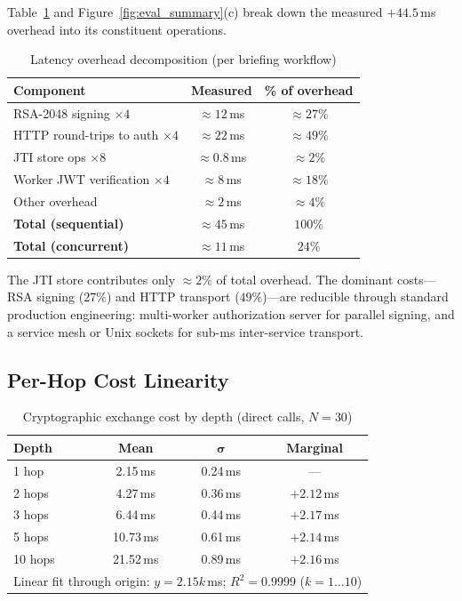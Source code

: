 \documentclass[journal]{IEEEtran}
\theoremstyle{definition}
\begin{document}
Table~\ref{tab:decomp} and Figure~\ref{fig:eval_summary}(c) break down the measured $+44.5$\,ms overhead into its constituent operations.

\begin{table}[h]
\caption{Latency overhead decomposition (per briefing workflow)}
\label{tab:decomp}
\centering
\footnotesize
\begin{tabular}{lcc}
\toprule
\textbf{Component} & \textbf{Measured} & \textbf{\% of overhead} \\
\midrule
RSA-2048 signing $\times 4$         & $\approx 12$\,ms  & $\approx 27\%$ \\
HTTP round-trips to auth $\times 4$ & $\approx 22$\,ms  & $\approx 49\%$ \\
JTI store ops $\times 8$            & $\approx 0.8$\,ms & $\approx 2\%$  \\
Worker JWT verification $\times 4$  & $\approx 8$\,ms   & $\approx 18\%$ \\
Other overhead                      & $\approx 2$\,ms   & $\approx 4\%$  \\
\midrule
\textbf{Total (sequential)}         & $\approx 45$\,ms  & $100\%$ \\
\textbf{Total (concurrent)}         & $\approx 11$\,ms  & $24\%$  \\
\bottomrule
\end{tabular}
\end{table}

The JTI store contributes only $\approx 2\%$ of total overhead. The
dominant costs---RSA signing ($27\%$) and HTTP transport ($49\%$)---are
reducible through standard production engineering: multi-worker authorization
server for parallel signing, and a service mesh or Unix sockets for sub-ms
inter-service transport.

\subsection{Per-Hop Cost Linearity}

\begin{table}[h]
\caption{Cryptographic exchange cost by depth (direct calls, $N=30$)}
\label{tab:hopcosts}
\centering
\footnotesize
\begin{tabular}{lccc}
\toprule
\textbf{Depth} & \textbf{Mean} & $\boldsymbol\sigma$ & \textbf{Marginal} \\
\midrule
1 hop  &  2.15\,ms & 0.24\,ms & ---        \\
2 hops &  4.27\,ms & 0.36\,ms & $+2.12$\,ms \\
3 hops &  6.44\,ms & 0.44\,ms & $+2.17$\,ms \\
5 hops & 10.73\,ms & 0.61\,ms & $+2.14$\,ms \\
10 hops & 21.52\,ms & 0.89\,ms & $+2.16$\,ms \\
\midrule
\multicolumn{4}{l}{\scriptsize
  Linear fit through origin: $y = 2.15k$\,ms;\; $R^2 = 0.9999$ ($k=1\ldots10$)}
\end{tabular}
\end{table}
\end{document}
